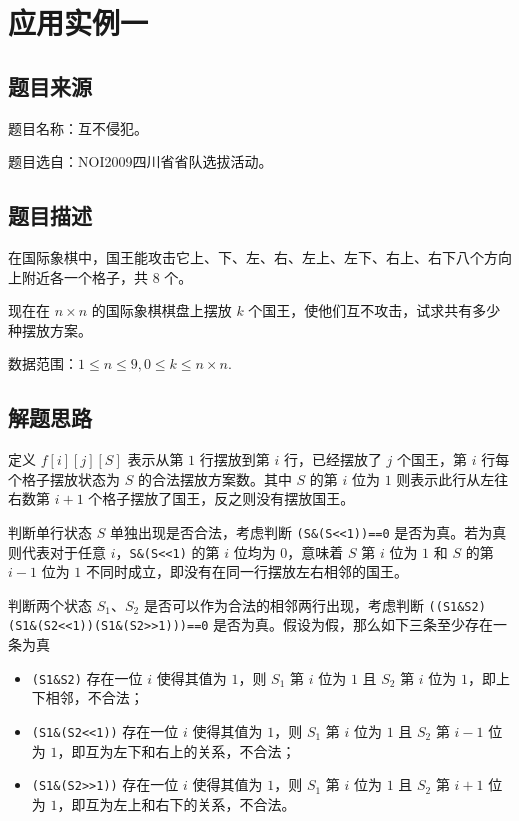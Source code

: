 \section{应用实例一}

\subsection{题目来源}

题目名称：互不侵犯。

题目选自：NOI2009四川省省队选拔活动。

\subsection{题目描述}

在国际象棋中，国王能攻击它上、下、左、右、左上、左下、右上、右下八个方向上附近各一个格子，共
\(8\) 个。

现在在 \(n\times n\) 的国际象棋棋盘上摆放 \(k\)
个国王，使他们互不攻击，试求共有多少种摆放方案。

数据范围：\(1\le n\le 9,0\le k\le n\times n\).

\subsection{解题思路}

定义 \(f[i][j][S]\) 表示从第 \(1\) 行摆放到第 \(i\) 行，已经摆放了 \(j\)
个国王，第 \(i\) 行每个格子摆放状态为 \(S\) 的合法摆放方案数。其中 \(S\)
的第 \(i\) 位为 \(1\) 则表示此行从左往右数第 \(i+1\)
个格子摆放了国王，反之则没有摆放国王。

判断单行状态 \(S\) 单独出现是否合法，考虑判断
\texttt{(S\&(S\textless{}\textless{}1))==0}
是否为真。若为真则代表对于任意
\(i\)，\texttt{S\&(S\textless{}\textless{}1)} 的第 \(i\) 位均为
\(0\)，意味着 \(S\) 第 \(i\) 位为 \(1\) 和 \(S\) 的第 \(i-1\) 位为 \(1\)
不同时成立，即没有在同一行摆放左右相邻的国王。

判断两个状态 \(S_1\)、\(S_2\) 是否可以作为合法的相邻两行出现，考虑判断
\texttt{((S1\&S2)\textbar{}\textbar{}(S1\&(S2\textless{}\textless{}1))\textbar{}\textbar{}(S1\&(S2\textgreater{}\textgreater{}1)))==0}
是否为真。假设为假，那么如下三条至少存在一条为真

\begin{itemize}

\item
  \texttt{(S1\&S2)} 存在一位 \(i\) 使得其值为 \(1\)，则 \(S_1\) 第 \(i\)
  位为 \(1\) 且 \(S_2\) 第 \(i\) 位为 \(1\)，即上下相邻，不合法；
\item
  \texttt{(S1\&(S2\textless{}\textless{}1))} 存在一位 \(i\) 使得其值为
  \(1\)，则 \(S_1\) 第 \(i\) 位为 \(1\) 且 \(S_2\) 第 \(i-1\) 位为
  \(1\)，即互为左下和右上的关系，不合法；
\item
  \texttt{(S1\&(S2\textgreater{}\textgreater{}1))} 存在一位 \(i\)
  使得其值为 \(1\)，则 \(S_1\) 第 \(i\) 位为 \(1\) 且 \(S_2\) 第 \(i+1\)
  位为 \(1\)，即互为左上和右下的关系，不合法。
\end{itemize}


